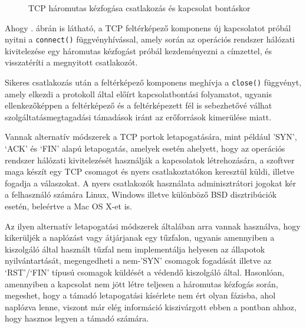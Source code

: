 \documentclass[a4paper,12pt]{article}
\begin{document}
	\begin{figure}[!htbp]
		\centering
		\caption{TCP háromutas kézfogása csatlakozás és kapcsolat bontáskor}
		\label{tcp3way}
	\end{figure}
	
	Ahogy \az{\ref{tcp3way}}. ábrán is látható, a TCP feltérképező komponens új kapcsolatot próbál nyitni a \texttt{connect()} függvényhívással, amely során az operációs rendszer hálózati kivitelezése egy háromutas kézfogást próbál kezdeményezni a címzettel, és visszatéríti a megnyitott csatlakozót.
	
	Sikeres csatlakozás után a feltérképező komponens meghívja a \texttt{close()} függvényt, amely elkezdi a protokoll által előírt kapcsolatbontási folyamatot, ugyanis ellenkezőképpen a feltérképező és a feltérképezett fél is sebezhetővé válhat szolgáltatásmegtagadási támadások iránt az erőforrások kimerülése miatt\cite{erickson08}.
	
	Vannak alternatív módszerek a TCP portok letapogatására, mint például 'SYN', `ACK' és `FIN' alapú letapogatás\cite{kris07}, amelyek esetén ahelyett, hogy az operációs rendszer hálózati kivitelezését használják a kapcsolatok létrehozására, a szoftver maga készít egy TCP csomagot és nyers csatlakoztatókon keresztül küldi, illetve fogadja a válaszokat. A nyers csatlakozók használata adminisztrátori jogokat kér a felhasználó számára Linux, Windows illetve különböző BSD disztribúciók esetén, beleértve a Mac OS X-et is.
	
	Az ilyen alternatív letapogatási módszerek általában arra vannak használva, hogy kikerüljék a naplózást vagy átjárjanak egy tűzfalon, ugyanis amennyiben a kiszolgáló által használt tűzfal nem implementálja helyesen az állapotok nyilvántartását, megengedheti a nem-'SYN' csomagok fogadását illetve az `RST'/`FIN' típusú csomagok küldését a védendő kiszolgáló által. Hasonlóan, amennyiben a kapcsolat nem jött létre teljesen a háromutas kézfogás során, megeshet, hogy a támadó letapogatási kísérlete nem ért olyan fázisba, ahol naplózva lenne, viszont már elég információ kiszivárgott ebben a pontban ahhoz, hogy hasznos legyen a támadó számára.
	
\end{document}

